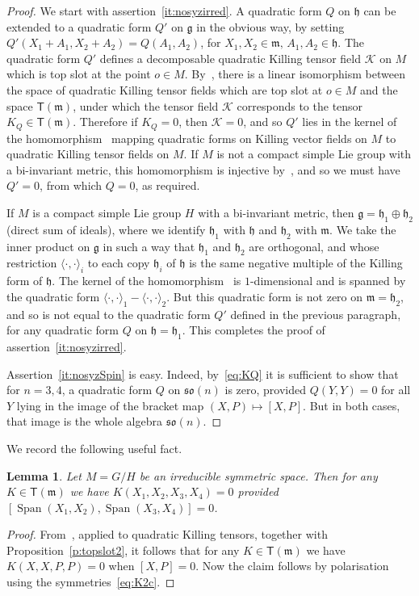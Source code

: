 \documentclass[10pt,a4paper]{amsart}
\newcommand \Span{\operatorname{Span}}
\newcommand \cK{\mathcal{K}}
\newcommand \sT{\mathsf{T}}
\newcommand\g{\mathfrak g}
\newcommand\h{\mathfrak h}
\newcommand\m{\mathfrak m}
\newcommand \so{\mathfrak{so}}
\newcommand \<{\langle}
\renewcommand \>{\rangle}
\newcommand \ip{\<\cdot,\cdot\>}
\newtheorem{lemma}{Lemma}
\begin{document}
	\begin{proof} 
		We start with assertion~\eqref{it:nosyzirred}. A quadratic form $Q$ on $\h$ can be extended to a quadratic form $Q'$ on $\g$ in the obvious way, by setting $Q'(X_1+A_1,X_2+A_2) = Q(A_1,A_2)$, for $X_1, X_2 \in \m, \, A_1,A_2 \in \h$. The quadratic form $Q'$ defines a decomposable quadratic Killing tensor field $\cK$ on $M$ which is top slot at the point $o \in M$. By~\cite[Theorem~3]{MN2}, there is a linear isomorphism between the space of quadratic Killing tensor fields which are top slot at $o \in M$ and the space $\sT(\m)$, under which the tensor field $\cK$ corresponds to the tensor $K_Q \in \sT(\m)$. Therefore if $K_Q = 0$, then $\cK = 0$, and so $Q'$ lies in the kernel of the homomorphism~\cite[Equation~(43)]{EL} mapping quadratic forms on Killing vector fields on $M$ to quadratic Killing tensor fields on $M$. If $M$ is not a compact simple Lie group with a bi-invariant metric, this homomorphism is injective by~\cite[Corollary~3]{EL}, and so we must have $Q' = 0$, from which $Q=0$, as required.

If $M$ is  a compact simple Lie group $H$ with a bi-invariant metric, then $\g = \h_1 \oplus \h_2$ (direct sum of ideals), where we identify $\h_1$ with $\h$ and $\h_2$ with $\m$. We take the inner product on $\g$ in such a way that $\h_1$ and $\h_2$ are orthogonal, and whose restriction $\ip_i$ to each copy $\h_i$ of $\h$ is the same negative multiple of the Killing form of $\h$. The kernel of the homomorphism~\cite[Equation~(43)]{EL} is $1$-dimensional and is spanned by the quadratic form $\ip_1 - \ip_2$. But this quadratic form is not zero on $\m = \h_2$, and so is not equal to the quadratic form $Q'$ defined in the previous paragraph, for any quadratic form $Q$ on $\h = \h_1$. This completes the proof of assertion~\eqref{it:nosyzirred}.
	
Assertion~\eqref{it:nosyzSpin} is easy. Indeed, by~\eqref{eq:KQ} it is sufficient to show that for $n=3,4$, a quadratic form $Q$ on $\so(n)$ is zero, provided $Q(Y,Y)=0$ for all $Y$ lying in the image of the bracket map $(X,P) \mapsto [X,P]$. But in both cases, that image is the whole algebra $\so(n)$.
\end{proof}


We record the following useful fact.
	\begin{lemma} \label{l:fourcommute}
		Let $M= G/H$ be an irreducible symmetric space. Then for any $K \in \sT(\m)$ we have $K(X_1,X_2,X_3,X_4) = 0$ provided $[\Span(X_1,X_2),\Span(X_3,X_4)] = 0$.
	\end{lemma}
	\begin{proof}
		From~\cite[Corollary~2]{MN2}, applied to quadratic Killing tensors, together with Proposition~\ref{p:topslot2}, it follows that for any $K \in \sT(\m)$ we have $K(X,X,P,P) = 0$ when $[X, P] = 0$. Now the claim follows by polarisation using the symmetries~\eqref{eq:K2c}.
	\end{proof}
		
\end{document}

